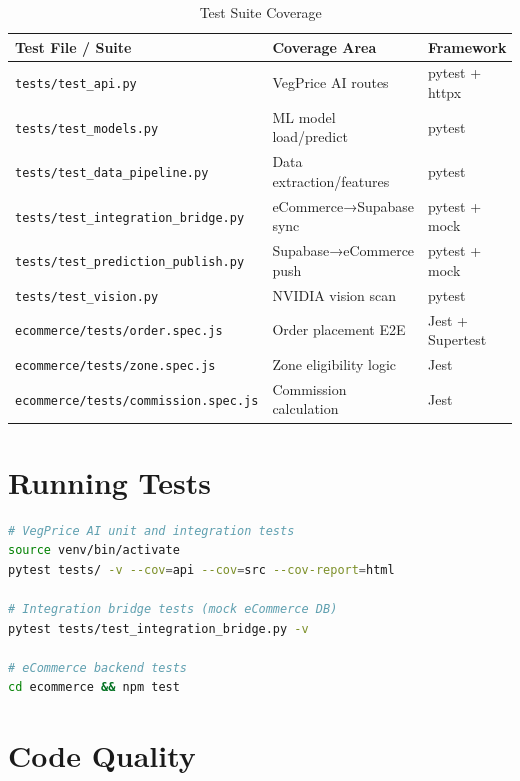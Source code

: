 \documentclass[12pt, a4paper, oneside]{report}
\begin{document}
\begin{table}[H]
\centering
\caption{Test Suite Coverage}
\label{tab:tests}
\begin{tabularx}{\textwidth}{@{} L{5.0cm} L{3.8cm} L{4.8cm} @{}}
\toprule
\textbf{Test File / Suite} & \textbf{Coverage Area} & \textbf{Framework} \\
\midrule
\texttt{tests/test\_api.py}               & VegPrice AI routes      & pytest + httpx \\
\texttt{tests/test\_models.py}            & ML model load/predict   & pytest \\
\texttt{tests/test\_data\_pipeline.py}    & Data extraction/features & pytest \\
\texttt{tests/test\_integration\_bridge.py}& eCommerce→Supabase sync & pytest + mock \\
\texttt{tests/test\_prediction\_publish.py}& Supabase→eCommerce push & pytest + mock \\
\texttt{tests/test\_vision.py}            & NVIDIA vision scan      & pytest \\
\texttt{ecommerce/tests/order.spec.js}    & Order placement E2E     & Jest + Supertest \\
\texttt{ecommerce/tests/zone.spec.js}     & Zone eligibility logic  & Jest \\
\texttt{ecommerce/tests/commission.spec.js}& Commission calculation  & Jest \\
\bottomrule
\end{tabularx}
\end{table}

\section{Running Tests}

\begin{lstlisting}[language=bash, numbers=none,
  caption={Test execution commands}]
# VegPrice AI unit and integration tests
source venv/bin/activate
pytest tests/ -v --cov=api --cov=src --cov-report=html

# Integration bridge tests (mock eCommerce DB)
pytest tests/test_integration_bridge.py -v

# eCommerce backend tests
cd ecommerce && npm test
\end{lstlisting}

\section{Code Quality}
\end{document}
